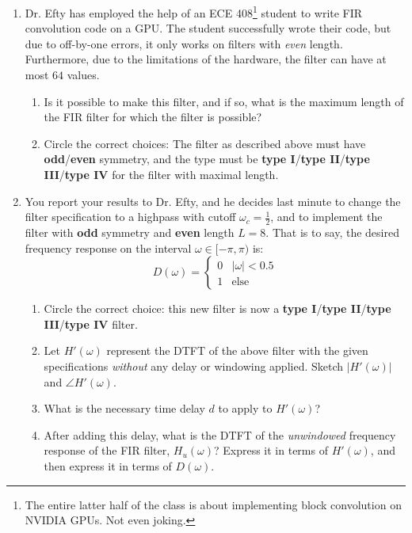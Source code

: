 \documentclass{article}
\begin{document}
\begin{enumerate}
    \item 
    Dr. Efty has employed the help of an ECE 408\footnote{The entire latter half of the class is about implementing block convolution on NVIDIA GPUs. Not even joking.} student to write FIR convolution code on a GPU. The student successfully wrote their code, but due to off-by-one errors, it only works on filters with \textit{even} length. Furthermore, due to the limitations of the hardware, the filter can have at most $64$ values.
    \begin{enumerate}
        \item Is it possible to make this filter, and if so, what is the maximum length of the FIR filter for which the filter is possible?
        \item Circle the correct choices: The filter as described above must have \textbf{odd}/\textbf{even} symmetry, and the type must be \textbf{type I}/\textbf{type II}/\textbf{type III}/\textbf{type IV} for the filter with maximal length. 
    \end{enumerate}
    \item
    You report your results to Dr. Efty, and he decides last minute to change the filter specification to a highpass with cutoff $\omega_c = \frac{1}{2}$, and to implement the filter with \textbf{odd} symmetry and \textbf{even} length $L=8$. That is to say, the desired frequency response on the interval $\omega \in [-\pi, \pi)$ is:
    \[
        D(\omega) = \begin{cases}
          0 & \vert \omega \vert < 0.5 \\
          1 & \text{else}
        \end{cases}
    \]
    \begin{enumerate}
        \item Circle the correct choice: this new filter is now a \textbf{type I}/\textbf{type II}/\textbf{type III}/\textbf{type IV} filter.
        \item Let $H'(\omega)$ represent the DTFT of the above filter with the given specifications \textit{without} any delay or windowing applied. Sketch $|H'(\omega)|$ and $\angle H'(\omega)$. \vspace{2cm}
        \item What is the necessary time delay $d$ to apply to $H'(\omega)$?
        \item After adding this delay, what is the DTFT of the \textit{unwindowed} frequency response of the FIR filter, $H_{u}(\omega)$? Express it in terms of $H'(\omega)$, and then express it in terms of $D(\omega)$. \vspace{2cm}

\end{enumerate}
\end{enumerate}
\end{document}
